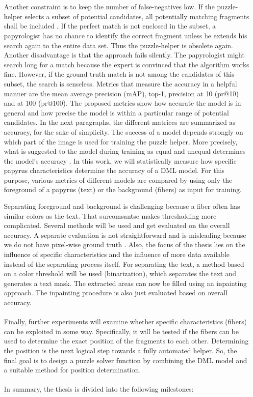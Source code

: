 \documentclass[12pt,a4paper]{article}
\begin{document}
\\\\
Another constraint is to keep the number of false-negatives low. If the puzzle-helper selects a subset of potential candidates, all potentially matching fragments shall be included . If the perfect match is not enclosed in the subset, a papyrologist has no chance to identify the correct fragment unless he extends his search again to the entire data set. Thus the puzzle-helper is obsolete again. Another disadvantage is that the approach fails silently. The papyrologist might search long for a match because the expert is convinced that the algorithm works fine. However, if the ground truth match is not among the candidates of this subset, the search is senseless. Metrics that measure the accuracy in a helpful manner are the mean average precision (mAP), top-1, precision at 10 (pr@10) and at 100 (pr@100).
The proposed metrics show how accurate the model is in general and how precise the model is within a particular range of potential candidates. In the next paragraphs, the different matrices are summarized as accuracy, for the sake of simplicity. The success of a model depends strongly on which part of the image is used for training the puzzle helper. More precisely, what is suggested to the model during training as equal and unequal determines the model's accuracy \cite{Pirrone21}. In this work, we will statistically measure how specific papyrus characteristics determine the accuracy of a DML model. For this purpose, various metrics of different models are compared by using only the foreground of a papyrus (text) or the background (fibers) as input for training. 

Separating foreground and background is challenging because a fiber often has similar colors as the text. That surcomsantse makes thresholding more complicated. Several methods will be used and get evaluated on the overall accuracy. A separate evaluation is not straightforward and is misleading because we do not have pixel-wise ground truth \cite{Tensmeyer20}. Also, the focus of the thesis lies on the influence of specific characteristics and the influence of more data available instead of the separating process itself. For separating the text,  a method based on a color threshold will be used (binarization), which separates the text and generates a text mask. 
The extracted areas can now be filled using an inpainting \cite{Ballester00} approach. The inpainting procedure is also just evaluated based on overall accuracy. 
\\\\
Finally, further experiments will examine whether specific characteristics (fibers) can be exploited in some way. Specifically, it will be tested if the fibers can be used to determine the exact position of the fragments to each other. Determining the position is the next logical step towards a fully automated helper. So, the final goal is to design a puzzle solver function by combining the DML model and a suitable method for position determination. 
\\\\
In summary, the thesis is divided into the following milestones:
\end{document}
